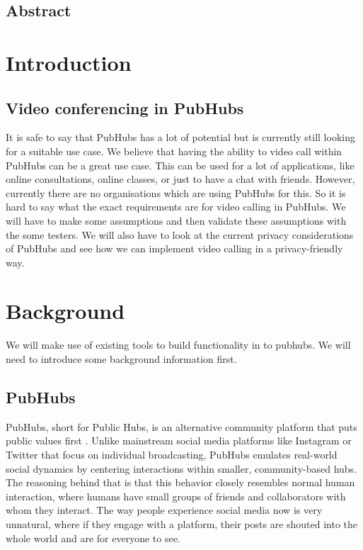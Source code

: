 \documentclass{report}
\begin{document}
    \tableofcontents

    \newpage
    \section*{Abstract}


    \chapter{Introduction}


    \section{Video conferencing in PubHubs}
    It is safe to say that PubHubs has a lot of potential but is currently still looking for a suitable use case. We
    believe that having the ability to video call within PubHubs can be a great use case. This can be used for a lot of
    applications, like online consultations, online classes, or just to have a chat with friends. However, currently
    there are no organisations which are using PubHubs for this. So it is hard to say what the exact requirements are
    for video calling in PubHubs. We will have to make some assumptions and then validate these assumptions with the
    some testers. We will also have to look at the current privacy
    considerations of PubHubs and see how we can implement video calling in a privacy-friendly way.

    \chapter{Background}
    We will make use of existing tools to build functionality in to pubhubs. We will need to introduce some background
    information first.


    \section{PubHubs}
    PubHubs, short for Public Hubs, is an alternative community platform that puts public values first
    \cite{jacobs_pubhubs_2023}
    . Unlike mainstream social media platforms like Instagram or Twitter that focus on individual broadcasting, PubHubs
    emulates real-world social dynamics by centering interactions within smaller, community-based hubs. The reasoning
    behind that is that this behavior closely resembles normal human interaction, where humans have small groups of
    friends and collaborators with whom they interact. The way people experience social media now is very unnatural,
    where if they engage with a platform, their posts are shouted into the whole world and are for everyone to see.
\end{document}
